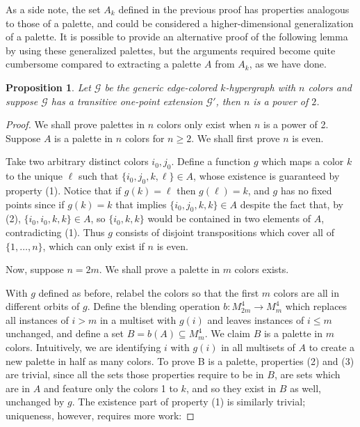 \documentclass{amsart}
\newtheorem{proposition}[theorem]{Proposition}
\def\graph{\mathcal{G}}
\newcommand{\set}[1]{\{#1 \}}
\begin{document}
As a side note, the set $A_k$ defined in the previous proof has properties analogous to those of a palette, and could be considered a higher-dimensional generalization of a palette. It is possible to provide an alternative proof of the following lemma by using these generalized palettes, but the arguments required become quite cumbersome compared to extracting a palette $A$ from $A_k$, as we have done. 



\begin{proposition}\label{only if direction of graph theorem}
    Let $\graph$ be the generic edge-colored $k$-hypergraph with $n$ colors and suppose $\graph$ has a transitive one-point extension $\graph'$, then $n$ is a power of $2$.
\end{proposition}
\begin{proof}
    We shall prove palettes in $n$ colors only exist when $n$ is a power of 2. Suppose $A$ is a palette in $n$ colors for $n \geq 2$. We shall first prove $n$ is even.

    Take two arbitrary distinct colors $i_0, j_0$. Define a function $g$ which maps a color $k$ to the unique $\ell$ such that $\set{i_0, j_0, k, \ell} \in A$, whose existence is guaranteed by property (1). Notice that if $g(k) = \ell$ then $g(\ell) = k$, and $g$ has no fixed points since if $g(k) = k$ that implies $\{i_0, j_0, k, k\} \in A$ despite the fact that, by (2), $\{i_0, i_0, k, k\} \in A$, so $\{i_0, k, k\}$ would be contained in two elements of $A$, contradicting (1). Thus $g$ consists of disjoint transpositions which cover all of $\set{1, \dots, n}$, which can only exist if $n$ is even.

    Now, suppose $n = 2m$. We shall prove a palette in $m$ colors exists. 

    With $g$ defined as before, relabel the colors so that the first $m$ colors are all in different orbits of $g$. Define the blending operation $b: M_{2m}^4 \to M_m^4$ which replaces all instances of $i > m$ in a multiset with $g(i)$ and leaves instances of $i \leq m$ unchanged, and define a set $B = b(A) \subseteq M_m^4$. We claim $B$ is a palette in $m$ colors. Intuitively, we are identifying $i$ with $g(i)$ in all multisets of $A$ to create a new palette in half as many colors. To prove B is a palette, properties (2) and (3) are trivial, since all the sets those properties require to be in $B$, are sets which are in $A$ and feature only the colors 1 to $k$, and so they exist in $B$ as well, unchanged by $g$. The existence part of property (1) is similarly trivial; uniqueness, however, requires more work:
    

\end{proof}
\end{document}
